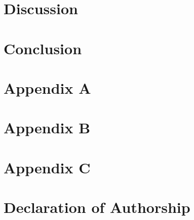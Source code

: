 \documentclass{thesis}
\begin{document}
\chapter{Discussion}\label{ch:discussion}


\chapter{Conclusion}\label{ch:conclusion}


\printbibliography[title=References, heading=bibintoc]

\appendix

\chapter{Appendix A}\label{ch:appendix-a}


\chapter{Appendix B}\label{ch:appendix-b}


\chapter{Appendix C}\label{ch:appendix-c}


\chapter*{Declaration of Authorship}\label{ch:declaration-of-authorship}

\end{document}

